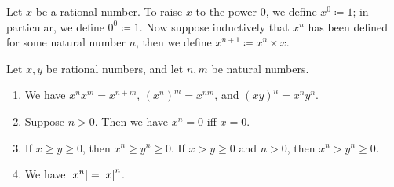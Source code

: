\begin{defn}\label{i:4.3.9}
  Let \(x\) be a rational number.
  To raise \(x\) to the power \(0\), we define \(x^0 \coloneqq 1\);
  in particular, we define \(0^0 \coloneqq 1\).
  Now suppose inductively that \(x^n\) has been defined for some natural number \(n\), then we define \(x^{n+1} \coloneqq x^n \times x\).
\end{defn}

\begin{prop}\label{i:4.3.10}
  Let \(x, y\) be rational numbers, and let \(n, m\) be natural numbers.
  \begin{enumerate}
    \item\label{i:4.3.10.a} We have \(x^n x^m = x^{n + m}\), \((x^n)^m = x^{nm}\), and \((xy)^n = x^n y^n\).
    \item\label{i:4.3.10.b} Suppose \(n > 0\).
    Then we have \(x^n = 0\) iff \(x = 0\).
    \item\label{i:4.3.10.c} If \(x \geq y \geq 0\), then \(x^n \geq y^n \geq 0\).
    If \(x > y \geq 0\) and \(n > 0\), then \(x^n > y^n \geq 0\).
    \item\label{i:4.3.10.d} We have \(\left\lvert x^n\right\rvert = \left\lvert x\right\rvert^n\).
  \end{enumerate}
\end{prop}

